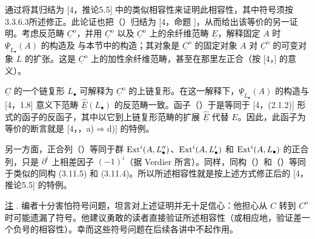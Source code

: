通过将其归结为 [4，推论5.5] 中的类似相容性来证明此相容性，其中符号须按3.3.6.3所述修正。此论证也把（）归结为 [4，命题 ]，从而给出该等价的另一证明。考虑反范畴 $\underline C^{\mathrm o}$，并用 $\underline C^{\mathrm o}$ 以及 $\underline C^{\mathrm o}$ 上的余纤维范畴 $\underline E$，解释固定 $A$ 时 $\underline\Psi_{L_\bullet}(A)$ 的构造及  与本节中的构造；其对象是 $\underline C^{\mathrm o}$ 的固定对象 $A$ 对 $\underline C^{\mathrm o}$ 的可变对象 $L$ 的扩张。这是 $\underline C^{\mathrm o}$ 上的加性余纤维范畴，甚至在那里左正合（按 [4，] 的意义）。

$\underline C$ 的一个链复形 $L_\bullet$ 可解释为 $\underline C^{\mathrm o}$ 的上链复形。在这一解释下，$\underline\Psi_{L_\bullet}(A)$ 的构造与 [4，1.8] 意义下范畴 $\underline{\widehat E}(L_\bullet)$ 的反范畴一致。函子（）于是等同于 [4，(2.1.2)] 形式的函子的反函子，其中以它到上链复形范畴的扩展 $\underline{\widehat E}$ 代替 $E$。因此，此函子为等价的断言就是 [4，，a)$\Rightarrow$d)] 的特例。

另一方面，正合列（）等同于群 $\operatorname{Ext}^i(A,L''_\bullet)$、$\operatorname{Ext}^i(A,L'_\bullet)$ 和 $\operatorname{Ext}^i(A,L_\bullet)$ 的正合列，只是 $\partial^i$ 上相差因子 $(-1)^i$（据 Verdier 所言）。同样，同构（）和（）等同于类似的同构 (3.11.5) 和 (3.11.4)。所以所述相容性就是按上述方式修正后的 [4，推论5.5] 的特例。

\underline{注} . 编者十分害怕符号问题，坦言对上述证明并无十足信心：他担心从 $C$ 转到 $C^{\mathrm o}$ 时可能遗漏了符号。他建议勇敢的读者直接验证所述相容性（或相应地，验证差一个负号的相容性）。幸而这些符号问题在后续各讲中不起作用。



